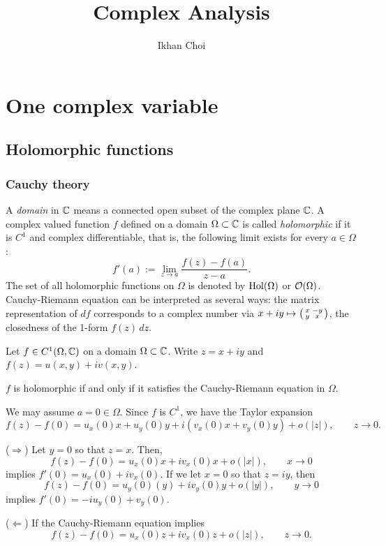 \documentclass{../../large}
\begin{document}
\title{Complex Analysis}
\author{Ikhan Choi}
\maketitle
\tableofcontents


\part{One complex variable}


\chapter{Holomorphic functions}
\section{Cauchy theory}

\begin{prb}
A \emph{domain} in $\C$ means a connected open subset of the complex plane $\C$.
A complex valued function $f$ defined on a domain $\Omega\subset\C$ is called \emph{holomorphic} if it is $C^1$ and complex differentiable, that is, the following limit exists for every $a\in\Omega$:
\[f'(a):=\lim_{z\to a}\frac{f(z)-f(a)}{z-a}.\]
The set of all holomorphic functions on $\Omega$ is denoted by $\Hol(\Omega)$ or $\cO(\Omega)$.
Cauchy-Riemann equation can be interpreted as several ways: the matrix representation of $df$ corresponds to a complex number via $x+iy\mapsto\left(\mat[small]{x&-y\\y&x}\right)$, the closedness of the 1-form $f(z)\,dz$.

Let $f\in C^1(\Omega,\C)$ on a domain $\Omega\subset\C$.
Write $z=x+iy$ and $f(z)=u(x,y)+iv(x,y)$.
\begin{parts}
\item $f$ is holomorphic if and only if it satisfies the Cauchy-Riemann equation in $\Omega$.
\end{parts}
\end{prb}
\begin{pf}
We may assume $a=0\in\Omega$.
Since $f$ is $C^1$, we have the Taylor expansion
\[f(z)-f(0)=u_x(0)x+u_y(0)y+i(v_x(0)x+v_y(0)y)+o(|z|),\qquad z\to0.\]

($\Rightarrow$)
Let $y=0$ so that $z=x$.
Then,
\[f(z)-f(0)=u_x(0)x+iv_x(0)x+o(|x|),\qquad x\to0\]
implies $f'(0)=u_x(0)+iv_x(0)$.
If we let $x=0$ so that $z=iy$, then
\[f(z)-f(0)=u_y(0)(y)+iv_y(0)y+o(|y|),\qquad y\to0\]
implies $f'(0)=-iu_y(0)+v_y(0)$.


($\Leftarrow$)
If the Cauchy-Riemann equation implies
\[f(z)-f(0)=u_x(0)z+iv_x(0)z+o(|z|),\qquad z\to0.\]
\end{pf}
\end{document}
